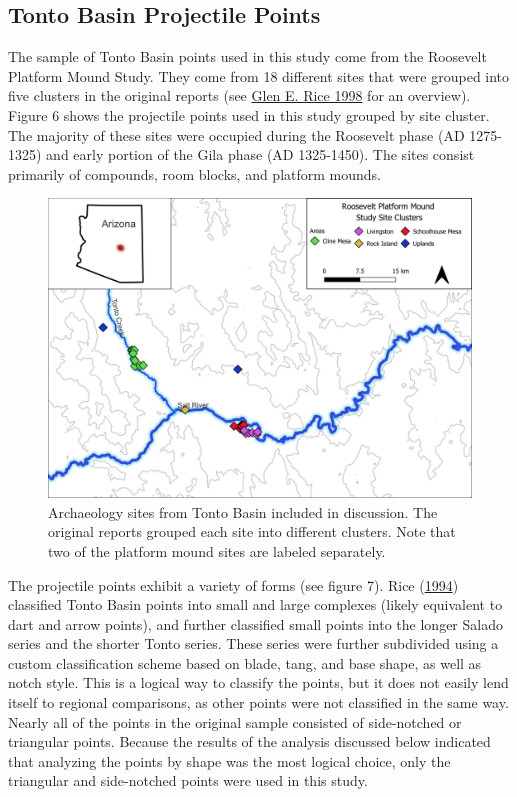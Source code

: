 \documentclass{article}
\begin{document}
\hypertarget{tonto-basin-projectile-points}{%
\subsection{Tonto Basin Projectile
Points}\label{tonto-basin-projectile-points}}

The sample of Tonto Basin points used in this study come from the
Roosevelt Platform Mound Study. They come from 18 different sites that
were grouped into five clusters in the original reports (see
\protect\hyperlink{ref-Rice1998-ku}{Glen E. Rice 1998} for an overview).
Figure 6 shows the projectile points used in this study grouped by site
cluster. The majority of these sites were occupied during the Roosevelt
phase (AD 1275-1325) and early portion of the Gila phase (AD 1325-1450).
The sites consist primarily of compounds, room blocks, and platform
mounds.

\begin{figure}
\includegraphics[width=1\linewidth]{figures/TontoBasinSitesv2} \caption{Archaeology sites from Tonto Basin included in discussion. The original reports grouped each site into different clusters. Note that two of the platform mound sites are labeled separately.}\label{fig:TontoBasinSites}
\end{figure}

The projectile points exhibit a variety of forms (see figure 7). Rice
(\protect\hyperlink{ref-Rice1994-rk}{1994}) classified Tonto Basin
points into small and large complexes (likely equivalent to dart and
arrow points), and further classified small points into the longer
Salado series and the shorter Tonto series. These series were further
subdivided using a custom classification scheme based on blade, tang,
and base shape, as well as notch style. This is a logical way to
classify the points, but it does not easily lend itself to regional
comparisons, as other points were not classified in the same way. Nearly
all of the points in the original sample consisted of side-notched or
triangular points. Because the results of the analysis discussed below
indicated that analyzing the points by shape was the most logical
choice, only the triangular and side-notched points were used in this
study.
\end{document}
